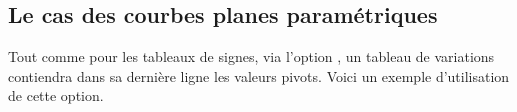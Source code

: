 \documentclass[10pt, a4paper]{article}
\begin{document}

\subsection{Le cas des courbes planes paramétriques}

Tout comme pour les tableaux de signes, via l'option , un tableau de variations contiendra dans sa dernière ligne les valeurs pivots. Voici un exemple d'utilisation de cette option. 
\end{document}
